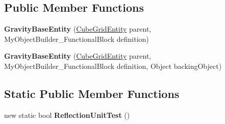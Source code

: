 \subsection*{Public Member Functions}
\begin{DoxyCompactItemize}
\item 
\hypertarget{class_s_e_mod_a_p_i_internal_1_1_a_p_i_1_1_entity_1_1_sector_1_1_sector_object_1_1_cube_grid_1_19775a6da854269d8b1b6a1ac0a29f275_ac38ac962754c3d9912a32df340800b75}{}{\bfseries Gravity\+Base\+Entity} (\hyperlink{class_s_e_mod_a_p_i_internal_1_1_a_p_i_1_1_entity_1_1_sector_1_1_sector_object_1_1_cube_grid_entity}{Cube\+Grid\+Entity} parent, My\+Object\+Builder\+\_\+\+Functional\+Block definition)\label{class_s_e_mod_a_p_i_internal_1_1_a_p_i_1_1_entity_1_1_sector_1_1_sector_object_1_1_cube_grid_1_19775a6da854269d8b1b6a1ac0a29f275_ac38ac962754c3d9912a32df340800b75}

\item 
\hypertarget{class_s_e_mod_a_p_i_internal_1_1_a_p_i_1_1_entity_1_1_sector_1_1_sector_object_1_1_cube_grid_1_19775a6da854269d8b1b6a1ac0a29f275_a9df7592c15cd91cfd5338df694bce75a}{}{\bfseries Gravity\+Base\+Entity} (\hyperlink{class_s_e_mod_a_p_i_internal_1_1_a_p_i_1_1_entity_1_1_sector_1_1_sector_object_1_1_cube_grid_entity}{Cube\+Grid\+Entity} parent, My\+Object\+Builder\+\_\+\+Functional\+Block definition, Object backing\+Object)\label{class_s_e_mod_a_p_i_internal_1_1_a_p_i_1_1_entity_1_1_sector_1_1_sector_object_1_1_cube_grid_1_19775a6da854269d8b1b6a1ac0a29f275_a9df7592c15cd91cfd5338df694bce75a}

\end{DoxyCompactItemize}
\subsection*{Static Public Member Functions}
\begin{DoxyCompactItemize}
\item 
\hypertarget{class_s_e_mod_a_p_i_internal_1_1_a_p_i_1_1_entity_1_1_sector_1_1_sector_object_1_1_cube_grid_1_19775a6da854269d8b1b6a1ac0a29f275_a9c522c1dddd1126535863c0ef5be6387}{}new static bool {\bfseries Reflection\+Unit\+Test} ()\label{class_s_e_mod_a_p_i_internal_1_1_a_p_i_1_1_entity_1_1_sector_1_1_sector_object_1_1_cube_grid_1_19775a6da854269d8b1b6a1ac0a29f275_a9c522c1dddd1126535863c0ef5be6387}

\end{DoxyCompactItemize}

